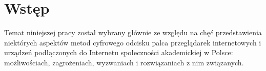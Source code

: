 \chapter*{Wstęp}


Temat niniejszej pracy został wybrany głównie ze względu na chęć przedstawienia
niektórych aspektów metod cyfrowego odcisku palca przeglądarek internetowych i
urządzeń podłączonych do Internetu społeczności akademickiej w Polsce:
możliwościach, zagrożeniach, wyzwaniach i rozwiązaniach z nim związanych.
